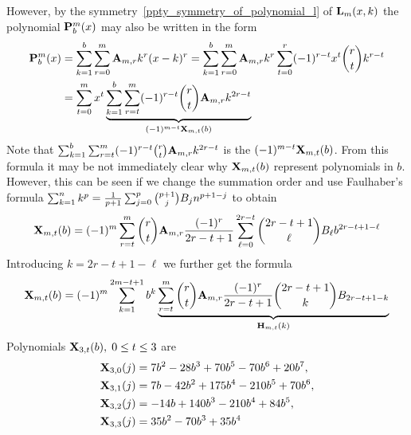 However, by the symmetry~\eqref{ppty_symmetry_of_polynomial_l} of ${\mathbf{L}}\sb{m}(x,k)$ the polynomial
${\mathbf{P}}\sp{m} \sb{b}(x)$ may also be written in the form
\begin{equation*}
    \begin{split}
        {\mathbf{P}}\sp{m} \sb{b}(x)
        &=\sum_{k=1}^{b} \sum_{r=0}^{m} {\mathbf{A}} \sb{m,r} k^r(x-k)^r
        =\sum_{k=1}^{b} \sum_{r=0}^{m} {\mathbf{A}} \sb{m,r} k^r \sum_{t=0}^{r} (-1)^{r-t} x^t \binom{r}{t} k^{r-t} \\
        &=\sum_{t=0}^{m} x^t
        \underbrace{\sum_{k=1}^{b} \sum_{r=t}^{m} (-1)^{r-t} \binom{r}{t} {\mathbf{A}} \sb{m,r} k^{2r-t}}_{(-1)^{m-t} {\mathbf{X}}\sb{m,t} (b)}
    \end{split}
\end{equation*}
Note that
$\sum_{k=1}^{b} \sum_{r=t}^{m} (-1)^{r-t} \binom{r}{t} {\mathbf{A}} \sb{m,r} k^{2r-t}$
is the
$(-1)^{m-t} {\mathbf{X}}\sb{m,t} (b)$.
From this formula it may be not immediately clear why ${\mathbf{X}}\sb{m,t} (b)$ represent polynomials in $b$.
However, this can be seen if we change the summation order and use Faulhaber's formula
$\sum_{k=1}^{n} k^{p}=\frac{1}{p+1}\sum _{j=0}^{p} \binom{p+1}{j} {B}\sb{j} n^{p+1-j}$
to obtain
\begin{equation*}
    {\mathbf{X}}\sb{m,t} (b) = (-1)^m \sum_{r=t}^{m} \binom{r}{t} {\mathbf{A}} \sb{m,r} \frac{(-1)^r}{2r-t+1}
    \sum_{\ell=0}^{2r-t} \binom{2r-t+1}{\ell} {B}\sb{\ell} b^{2r-t+1-\ell}
\end{equation*}
Introducing $k=2r-t+1-\ell$ we further get the formula
\begin{equation*}
    {\mathbf{X}}\sb{m,t} (b) = (-1)^m \sum_{k=1}^{2m-t+1} b^k
    \underbrace{\sum_{r=t}^m \binom{r}{t} {\mathbf{A}} \sb{m,r} \frac{(-1)^r}{2r-t+1} \binom{2r-t+1}{k}
    {B}\sb{2r-t+1-k}}_{{\mathbf{H}} \sb{m,t} (k)}
\end{equation*}
Polynomials ${\mathbf{X}}\sb{3,t} (b), \; 0\leq t \leq 3$ are
\begin{equation*}
    \begin{split}
        {\mathbf{X}}\sb{3,0} (j)
        &=7 b^2 - 28 b^3 + 70 b^5 - 70 b^6 + 20 b^7, \\
        {\mathbf{X}}\sb{3,1} (j)
        &=7 b - 42 b^2 + 175 b^4 - 210 b^5 + 70 b^6, \\
        {\mathbf{X}}\sb{3,2} (j)
        &=-14 b + 140 b^3 - 210 b^4 + 84 b^5, \\
        {\mathbf{X}}\sb{3,3} (j)
        &=35 b^2 - 70 b^3 + 35 b^4
    \end{split}
\end{equation*}
